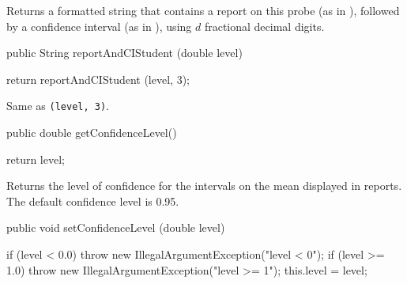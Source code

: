 \begin{tabb} Returns a formatted string that contains a report on this probe (as in
    ), followed by a confidence interval (as in
    ), using $d$ fractional decimal digits.
\end{tabb}
\begin{htmlonly}
\end{htmlonly}
\begin{code}

   public String reportAndCIStudent (double level) \begin{hide} {
      return reportAndCIStudent (level, 3);
  }\end{hide}
\end{code}
\begin{tabb} Same as  \texttt{(level, 3)}.
\end{tabb}
\begin{htmlonly}
\end{htmlonly}
\begin{code}

   public double getConfidenceLevel()\begin{hide} {
      return level;
   }\end{hide}
\end{code}
\begin{tabb}
   Returns the level of confidence for the intervals on the mean displayed in
   reports.  The default confidence level is 0.95.
\end{tabb}
\begin{htmlonly}
\end{htmlonly}
\begin{code}

   public void setConfidenceLevel (double level)\begin{hide} {
      if (level < 0.0)
         throw new IllegalArgumentException("level < 0");
      if (level >= 1.0)
         throw new IllegalArgumentException("level >= 1");
      this.level = level;
   }\end{hide}
\end{code}
